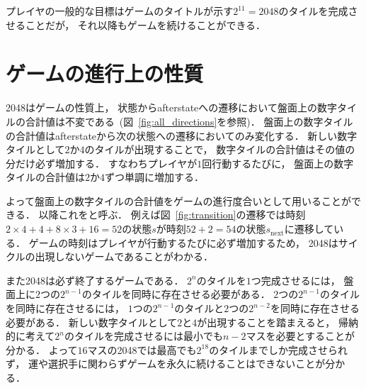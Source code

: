 プレイヤの一般的な目標はゲームのタイトルが示す$2^{11}=2048$のタイルを完成させることだが， それ以降もゲームを続けることができる．

\section{ゲームの進行上の性質}
\label{sec:property}
2048はゲームの性質上， 状態からafterstateへの遷移において盤面上の数字タイルの合計値は不変である~(図~\ref{fig:all_directions}を参照)．
盤面上の数字タイルの合計値はafterstateから次の状態への遷移においてのみ変化する．
新しい数字タイルとして$2$か$4$のタイルが出現することで， 数字タイルの合計値はその値の分だけ必ず増加する．
すなわちプレイヤが$1$回行動するたびに， 盤面上の数字タイルの合計値は$2$か$4$ずつ単調に増加する．

よって盤面上の数字タイルの合計値をゲームの進行度合いとして用いることができる．
以降これをと呼ぶ．
例えば図~\ref{fig:transition}の遷移では時刻$2\times4+4+8\times3+16=52$の状態$s$が時刻$52+2=54$の状態$s_{\text{next}}$に遷移している．
ゲームの時刻はプレイヤが行動するたびに必ず増加するため， 2048はサイクルの出現しないゲームであることがわかる．

また2048は必ず終了するゲームである．
$2^n$のタイルを$1$つ完成させるには， 盤面上に$2$つの$2^{n-1}$のタイルを同時に存在させる必要がある．
$2$つの$2^{n-1}$のタイルを同時に存在させるには， $1$つの$2^{n-1}$のタイルと$2$つの$2^{n-2}$を同時に存在させる必要がある．
新しい数字タイルとして$2$と$4$が出現することを踏まえると， 帰納的に考えて$2^n$のタイルを完成させるには最小でも$n-2$マスを必要とすることが分かる．
よって$16$マスの2048では最高でも$2^{18}$のタイルまでしか完成させられず， 運や選択手に関わらずゲームを永久に続けることはできないことが分かる．